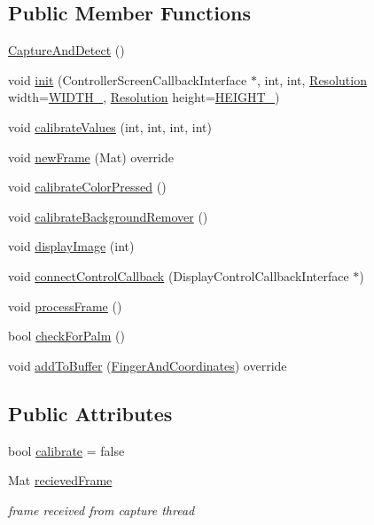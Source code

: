 \subsection*{Public Member Functions}
\begin{DoxyCompactItemize}
\item 
\hyperlink{classCaptureAndDetect_a26c41eaa5100975ec0f50c97592f4bf1}{Capture\+And\+Detect} ()
\item 
void \hyperlink{classCaptureAndDetect_a485523d1c8231e2f744bf9d7fa110f88}{init} (Controller\+Screen\+Callback\+Interface $\ast$, int, int, \hyperlink{CaptureAndDetect_8h_a3c1fc1369ee351f25804c8cde5e85ac3}{Resolution} width=\hyperlink{CaptureAndDetect_8h_a3c1fc1369ee351f25804c8cde5e85ac3a278580710dc7c233b4035c222f100b9f}{W\+I\+D\+T\+H\+\_}, \hyperlink{CaptureAndDetect_8h_a3c1fc1369ee351f25804c8cde5e85ac3}{Resolution} height=\hyperlink{CaptureAndDetect_8h_a3c1fc1369ee351f25804c8cde5e85ac3aaf8940bab7f04c8cd702f61c4d051f27}{H\+E\+I\+G\+H\+T\+\_})
\item 
void \hyperlink{classCaptureAndDetect_aafb4f601f860dd38f514f6dd29a1d016}{calibrate\+Values} (int, int, int, int)
\item 
void \hyperlink{classCaptureAndDetect_a7f18d1c58b2ae4241766b36aa27385e9}{new\+Frame} (Mat) override
\item 
void \hyperlink{classCaptureAndDetect_ac60f9b1d192c043fa9b40c38fc5599e6}{calibrate\+Color\+Pressed} ()
\item 
void \hyperlink{classCaptureAndDetect_a53065abfb6eed6c074ad4d3370b3f232}{calibrate\+Background\+Remover} ()
\item 
void \hyperlink{classCaptureAndDetect_a3f1ba69514a2debbc6b2a03e76f31b65}{display\+Image} (int)
\item 
void \hyperlink{classCaptureAndDetect_aa75e3ba836797d18aa02c72bbf975082}{connect\+Control\+Callback} (Display\+Control\+Callback\+Interface $\ast$)
\item 
void \hyperlink{classCaptureAndDetect_ac7e70bbcade4e0023541c556ee7cb34e}{process\+Frame} ()
\item 
bool \hyperlink{classCaptureAndDetect_a1620075ba1bf4d52a4e455c20f7ac3d1}{check\+For\+Palm} ()
\item 
void \hyperlink{classCaptureAndDetect_af376ab5418f7b235ee181d574da71fd6}{add\+To\+Buffer} (\hyperlink{classFingerAndCoordinates}{Finger\+And\+Coordinates}) override
\end{DoxyCompactItemize}
\subsection*{Public Attributes}
\begin{DoxyCompactItemize}
\item 
bool \hyperlink{classCaptureAndDetect_ae57b827ebac2b4d5f5baaa8935442183}{calibrate} = false
\item 
Mat \hyperlink{classCaptureAndDetect_ad614571fedee59ecccccf0c14c3dd542}{recieved\+Frame}
\begin{DoxyCompactList}\small\item\em frame received from capture thread \end{DoxyCompactList}\end{DoxyCompactItemize}


